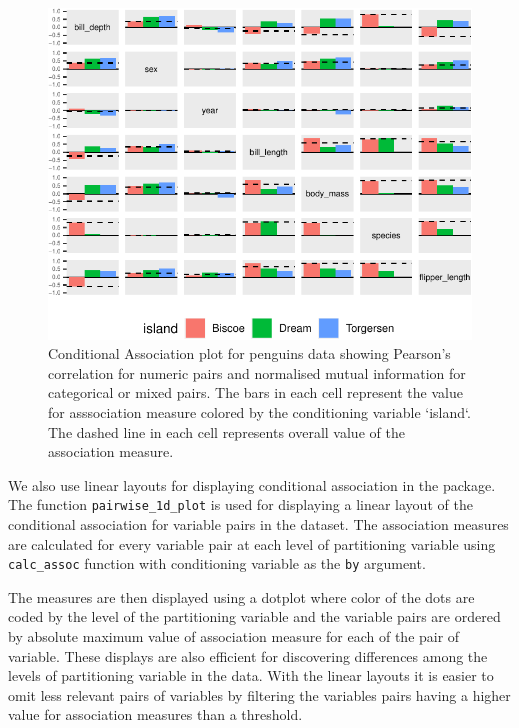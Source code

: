 \begin{Schunk}
\begin{figure}

{\centering \includegraphics{rj_paper_files/figure-latex/cond-assoc-1} 

}

\caption[Conditional Association plot for penguins data showing Pearson's correlation for numeric pairs and normalised mutual information for categorical or mixed pairs]{Conditional Association plot for penguins data showing Pearson's correlation for numeric pairs and normalised mutual information for categorical or mixed pairs. The bars in each cell represent the value for asssociation measure colored by the conditioning variable `island`. The dashed line in each cell represents overall value of the association measure.}\label{fig:cond-assoc}
\end{figure}
\end{Schunk}

We also use linear layouts for displaying conditional association in the
package. The function \texttt{pairwise\_1d\_plot} is used for displaying
a linear layout of the conditional association for variable pairs in the
dataset. The association measures are calculated for every variable pair
at each level of partitioning variable using \texttt{calc\_assoc}
function with conditioning variable as the \texttt{by} argument.

The measures are then displayed using a dotplot where color of the dots
are coded by the level of the partitioning variable and the variable
pairs are ordered by absolute maximum value of association measure for
each of the pair of variable. These displays are also efficient for
discovering differences among the levels of partitioning variable in the
data. With the linear layouts it is easier to omit less relevant pairs
of variables by filtering the variables pairs having a higher value for
association measures than a threshold.

